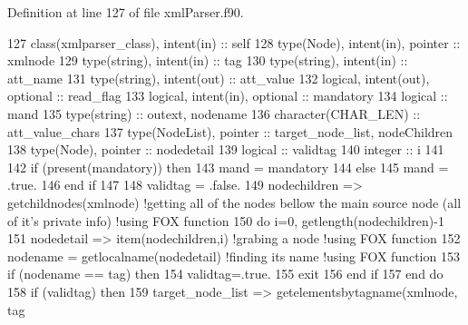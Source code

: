 Definition at line 127 of file xml\+Parser.\+f90.


\begin{DoxyCode}
127     \textcolor{keywordtype}{class}(xmlparser\_class), \textcolor{keywordtype}{intent(in)} :: self
128     \textcolor{keywordtype}{type}(Node), \textcolor{keywordtype}{intent(in)}, \textcolor{keywordtype}{pointer} :: xmlnode
129     \textcolor{keywordtype}{type}(string), \textcolor{keywordtype}{intent(in)} :: tag
130     \textcolor{keywordtype}{type}(string), \textcolor{keywordtype}{intent(in)} :: att\_name
131     \textcolor{keywordtype}{type}(string), \textcolor{keywordtype}{intent(out)} :: att\_value
132     \textcolor{keywordtype}{logical}, \textcolor{keywordtype}{intent(out)}, \textcolor{keywordtype}{optional} :: read\_flag
133     \textcolor{keywordtype}{logical}, \textcolor{keywordtype}{intent(in)}, \textcolor{keywordtype}{optional} :: mandatory
134     \textcolor{keywordtype}{logical} :: mand
135     \textcolor{keywordtype}{type}(string) :: outext, nodename
136     \textcolor{keywordtype}{character(CHAR\_LEN)} :: att\_value\_chars
137     \textcolor{keywordtype}{type}(NodeList), \textcolor{keywordtype}{pointer} :: target\_node\_list, nodeChildren
138     \textcolor{keywordtype}{type}(Node), \textcolor{keywordtype}{pointer} :: nodedetail
139     \textcolor{keywordtype}{logical} :: validtag
140     \textcolor{keywordtype}{integer} :: i
141 
142     \textcolor{keywordflow}{if} (\textcolor{keyword}{present}(mandatory)) \textcolor{keywordflow}{then}
143         mand = mandatory
144     \textcolor{keywordflow}{else}
145         mand = .true.
146 \textcolor{keywordflow}{    end if}
147     
148     validtag = .false.
149     nodechildren => getchildnodes(xmlnode) \textcolor{comment}{!getting all of the nodes bellow the main source node (all of
       it's private info) !using FOX function}
150     \textcolor{keywordflow}{do} i=0, getlength(nodechildren)-1
151         nodedetail => item(nodechildren,i) \textcolor{comment}{!grabing a node !using FOX function}
152         nodename = getlocalname(nodedetail)  \textcolor{comment}{!finding its name !using FOX function}
153         \textcolor{keywordflow}{if} (nodename == tag) \textcolor{keywordflow}{then}
154             validtag=.true.
155             \textcolor{keywordflow}{exit}
156 \textcolor{keywordflow}{        end if}
157 \textcolor{keywordflow}{    end do}
158     \textcolor{keywordflow}{if} (validtag) \textcolor{keywordflow}{then}
159         target\_node\_list => getelementsbytagname(xmlnode, tag%

\end{DoxyCode}
